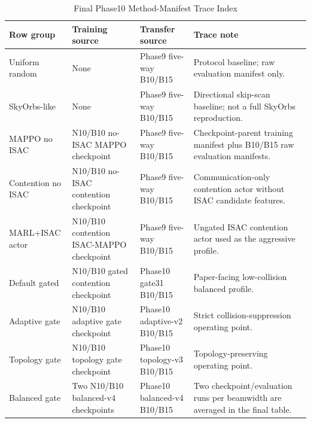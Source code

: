 \documentclass[journal]{IEEEtran}
\begin{document}
\begin{table}[!t]
  \centering
  \caption{Final Phase10 Method-Manifest Trace Index}
  \label{tab:supp_method_trace}
  \scriptsize
  \setlength{\tabcolsep}{3pt}
  \begin{tabular}{@{}p{}p{}p{}p{}@{}}
    \toprule
    Row group & Training source & Transfer source & Trace note \\
    \midrule
    Uniform random & None & Phase9 five-way B10/B15 & Protocol baseline; raw evaluation manifest only. \\
    SkyOrbs-like & None & Phase9 five-way B10/B15 & Directional skip-scan baseline; not a full SkyOrbs reproduction. \\
    MAPPO no ISAC & N10/B10 no-ISAC MAPPO checkpoint & Phase9 five-way B10/B15 & Checkpoint-parent training manifest plus B10/B15 raw evaluation manifests. \\
    Contention no ISAC & N10/B10 no-ISAC contention checkpoint & Phase9 five-way B10/B15 & Communication-only contention actor without ISAC candidate features. \\
    MARL+ISAC actor & N10/B10 contention ISAC-MAPPO checkpoint & Phase9 five-way B10/B15 & Ungated ISAC contention actor used as the aggressive profile. \\
    Default gated & N10/B10 gated contention checkpoint & Phase10 gate31 B10/B15 & Paper-facing low-collision balanced profile. \\
    Adaptive gate & N10/B10 adaptive gate checkpoint & Phase10 adaptive-v2 B10/B15 & Strict collision-suppression operating point. \\
    Topology gate & N10/B10 topology gate checkpoint & Phase10 topology-v3 B10/B15 & Topology-preserving operating point. \\
    Balanced gate & Two N10/B10 balanced-v4 checkpoints & Phase10 balanced-v4 B10/B15 & Two checkpoint/evaluation runs per beamwidth are averaged in the final table. \\
    \bottomrule
  \end{tabular}
\end{table}
\end{document}
